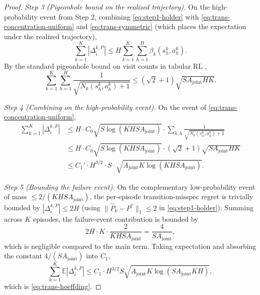 \documentclass{article}
\begin{document}
\begin{proof}
\textit{Step 3 (Pigeonhole bound on the realized trajectory).} On the high-probability event from Step 2, combining \eqref{eq:step1-holder} with \eqref{eq:trans-concentration-uniform} and \eqref{eq:trans-symmetric} (which places the expectation under the realized trajectory),
\begin{equation}
\sum_{k=1}^K |\Delta_i^{k,P}| \leq H \sum_{k=1}^K \sum_{h=1}^H \beta_k(s_h^k, a_h^k).
\end{equation}
By the standard pigeonhole bound on visit counts in tabular RL \citep[Lemma 19]{jaksch2010near},
\begin{equation}
\label{eq:pigeonhole}
\sum_{k=1}^K \sum_{h=1}^H \frac{1}{\sqrt{N_k(s_h^k, a_h^k) + 1}} \leq (\sqrt{2} + 1) \sqrt{S A_{\mathrm{joint}} H K}.
\end{equation}

\textit{Step 4 (Combining on the high-probability event).} On the event of \eqref{eq:trans-concentration-uniform},
\begin{align}
\sum_{k=1}^K |\Delta_i^{k,P}| &\leq H \cdot C_0 \sqrt{S \log(KH SA_{\mathrm{joint}})} \cdot \sum_{k, h} \frac{1}{\sqrt{N_k(s_h^k, a_h^k) + 1}} \\
&\leq H \cdot C_0 \sqrt{S \log(KH SA_{\mathrm{joint}})} \cdot (\sqrt{2}+1) \sqrt{S A_{\mathrm{joint}} H K} \\
&\leq C_1' \cdot H^{3/2} \cdot S \cdot \sqrt{A_{\mathrm{joint}} K \log(KH SA_{\mathrm{joint}})}.
\end{align}

\textit{Step 5 (Bounding the failure event).} On the complementary low-probability event of mass $\leq 2/(KH SA_{\mathrm{joint}})$, the per-episode transition-misspec regret is trivially bounded by $|\Delta_i^{k,P}| \leq 2H$ (using $\|\hat{P}_k - P^*\|_1 \leq 2$ in \eqref{eq:step1-holder}). Summing across $K$ episodes, the failure-event contribution is bounded by
\begin{equation}
2H \cdot K \cdot \frac{2}{KH SA_{\mathrm{joint}}} = \frac{4}{SA_{\mathrm{joint}}},
\end{equation}
which is negligible compared to the main term. Taking expectation and absorbing the constant $4/(SA_{\mathrm{joint}})$ into $C_1$,
\begin{equation}
\sum_{k=1}^K \mathbb{E}|\Delta_i^{k,P}| \leq C_1 \cdot H^{3/2} S \sqrt{A_{\mathrm{joint}} K \log(SA_{\mathrm{joint}}KH)},
\end{equation}
which is \eqref{eq:trans-hoeffding}.
\end{proof}
\end{document}
